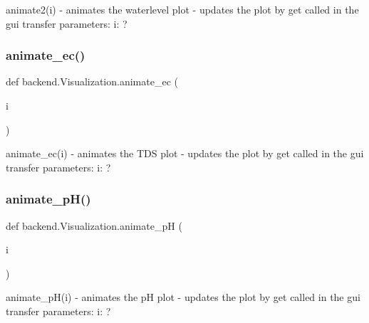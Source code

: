 \begin{DoxyVerb}animate2(i)
    - animates the waterlevel plot
    - updates the plot by get called in the gui
transfer parameters:
    i: ?
\end{DoxyVerb}
 \mbox{\label{classbackend_1_1Visualization_a877940d58679d6f81ff18560e5bf70b2_a877940d58679d6f81ff18560e5bf70b2}} 
\subsubsection{\texorpdfstring{animate\+\_\+ec()}{animate\_ec()}}
{\footnotesize\ttfamily def backend.\+Visualization.\+animate\+\_\+ec (\begin{DoxyParamCaption}\item[{}]{i }\end{DoxyParamCaption})}

\begin{DoxyVerb}animate_ec(i)
    - animates the TDS plot
    - updates the plot by get called in the gui
transfer parameters:
    i: ?
\end{DoxyVerb}
 \mbox{\label{classbackend_1_1Visualization_aa35b6da1761f7829c9d703a035dee838_aa35b6da1761f7829c9d703a035dee838}} 
\subsubsection{\texorpdfstring{animate\+\_\+p\+H()}{animate\_pH()}}
{\footnotesize\ttfamily def backend.\+Visualization.\+animate\+\_\+pH (\begin{DoxyParamCaption}\item[{}]{i }\end{DoxyParamCaption})}

\begin{DoxyVerb}animate_pH(i)
    - animates the pH plot
    - updates the plot by get called in the gui
transfer parameters:
    i: ?
\end{DoxyVerb}
 \mbox{\label{classbackend_1_1Visualization_a1ddce492652885eec4ca88268e96ebab_a1ddce492652885eec4ca88268e96ebab}} 
